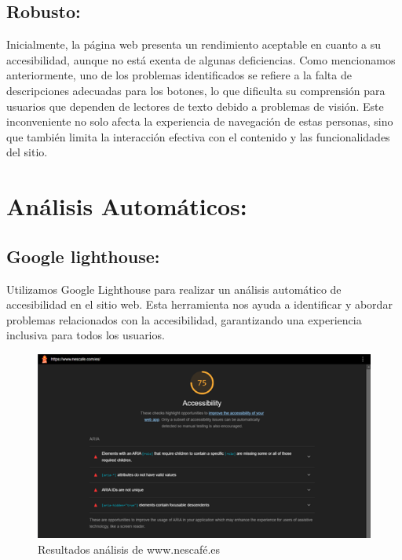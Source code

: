 \documentclass{article}
\begin{document}
\subsection{Robusto:}

Inicialmente, la página web presenta un rendimiento aceptable en cuanto a su accesibilidad, aunque no está exenta de algunas deficiencias. Como mencionamos anteriormente, uno de los problemas identificados se refiere a la falta de descripciones adecuadas para los botones, lo que dificulta su comprensión para usuarios que dependen de lectores de texto debido a problemas de visión. Este inconveniente no solo afecta la experiencia de navegación de estas personas, sino que también limita la interacción efectiva con el contenido y las funcionalidades del sitio.

\newpage

\section{Análisis Automáticos:}

\subsection{Google lighthouse:}

Utilizamos Google Lighthouse para realizar un análisis automático de accesibilidad en el sitio web. Esta herramienta nos ayuda a identificar y abordar problemas relacionados con la accesibilidad, garantizando una experiencia inclusiva para todos los usuarios.

\begin{figure}[!h]
        \centering
        \includegraphics[width=1\linewidth]{Imagen5.png}
        \caption{Resultados análisis de www.nescafé.es}
\end{figure}
\end{document}
